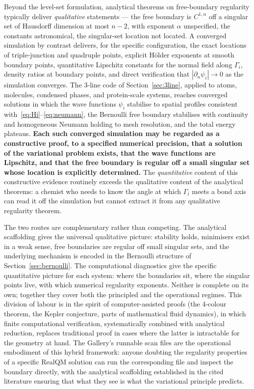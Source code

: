 \documentclass[11pt]{article}
\begin{document}
Beyond the level-set formulation, analytical theorems on free-boundary regularity typically deliver \emph{qualitative} statements --- the free boundary is $C^{1,\alpha}$ off a singular set of Hausdorff dimension at most $n-2$, with exponent $\alpha$ unspecified, the constants astronomical, the singular-set location not located. A converged simulation by contrast delivers, for the specific configuration, the exact locations of triple-junction and quadruple points, explicit H\"older exponents at smooth boundary points, quantitative Lipschitz constants for the normal field along $\Gamma_i$, density ratios at boundary points, and direct verification that $|\partial_n \psi_i| \to 0$ as the simulation converges. The 3-line code of Section~\ref{sec:3line}, applied to atoms, molecules, condensed phases, and protein-scale systems, reaches converged solutions in which the wave functions $\psi_i$ stabilise to spatial profiles consistent with~\eqref{eq:Hi}--\eqref{eq:neumann}, the Bernoulli free boundary stabilises with continuity and homogeneous Neumann holding to mesh resolution, and the total energy plateaus. \textbf{Each such converged simulation may be regarded as a constructive proof, to a specified numerical precision, that a solution of the variational problem exists, that the wave functions are Lipschitz, and that the free boundary is regular off a small singular set whose location is explicitly determined.} The \emph{quantitative} content of this constructive evidence routinely exceeds the qualitative content of the analytical theorems: a chemist who needs to know the angle at which $\Gamma_i$ meets a bond axis can read it off the simulation but cannot extract it from any qualitative regularity theorem.

The two routes are complementary rather than competing. The analytical scaffolding gives the universal qualitative picture: stability holds, minimisers exist in a weak sense, free boundaries are regular off small singular sets, and the underlying mechanism is encoded in the Bernoulli structure of Section~\ref{sec:bernoulli}. The computational diagnostics give the specific quantitative picture for each system: where the boundaries sit, where the singular points live, with which numerical regularity exponents. Neither is complete on its own; together they cover both the principled and the operational regimes. This division of labour is in the spirit of computer-assisted proofs (the 4-colour theorem, the Kepler conjecture, parts of mathematical fluid dynamics), in which finite computational verification, systematically combined with analytical reduction, replaces traditional proof in cases where the latter is intractable for the geometry at hand. The Gallery's runnable scan files are the operational embodiment of this hybrid framework: anyone doubting the regularity properties of a specific RealQM solution can run the corresponding file and inspect the boundary directly, with the analytical scaffolding established in the cited literature ensuring that what they see is what the variational principle predicts.
\end{document}
